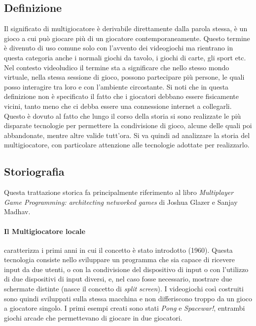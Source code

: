     \subsection{Definizione}\label{subsec:MultiDef}
        Il significato di multigiocatore è derivabile direttamente dalla parola stessa, è un gioco a cui può giocare più di un giocatore contemporaneamente. Questo termine è divenuto 
        di uso comune solo con l'avvento dei videogiochi ma rientrano in questa categoria anche i normali giochi da tavolo, i giochi di carte, gli sport etc.\\
        Nel contesto videoludico il termine sta a significare che nello stesso mondo virtuale, nella stessa sessione di gioco, possono partecipare più persone, le quali posso interagire
        tra loro e con l'ambiente circostante. Si noti che in questa definizione non è specificato il fatto che i giocatori debbano essere fisicamente vicini, tanto meno che ci 
        debba essere una connessione internet a collegarli. Questo è dovuto al fatto che lungo il corso della storia si sono realizzate le più disparate tecnologie per permettere la
        condivisione di gioco, alcune delle quali poi abbandonate, mentre altre valide tutt'ora. Si va quindi ad analizzare la storia del multigiocatore, con particolare attenzione 
        alle tecnologie adottate per realizzarlo.\\
    \subsection{Storiografia}\label{subsec:MultiStoriografia}
        Questa trattazione storica fa principalmente riferimento al libro \textit{Multiplayer Game Programming:  architecting networked games} di Joshua Glazer e Sanjay Madhav\cite{glazer2015}.
        \paragraph{Il Multigiocatore locale} caratterizza i primi anni in cui il concetto è stato introdotto (1960). Questa tecnologia consiste nello sviluppare un programma che sia
            capace di ricevere input da due utenti, o con la condivisione del dispositivo di input o con l'utilizzo di due dispositivi di input diversi, e, nel caso
            fosse necessario, mostrare due schermate distinte (nasce il concetto di \textit{split screen}). I videogiochi così costruiti sono quindi sviluppati sulla stessa macchina 
            e non differiscono troppo da un gioco a giocatore singolo. I primi esempi creati sono stati \textit{Pong} e \textit{Spacewar!}, entrambi giochi arcade che permettevano di 
            giocare in due giocatori.

